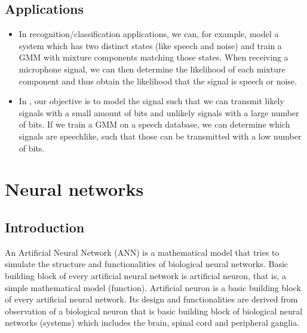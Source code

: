 \documentclass[letterpaper,10pt,english]{jupyterBook}
\begin{document}
\subsection{Applications}
\label{\detokenize{Modelling/Gaussian_mixture_model_GMM:applications}}\begin{itemize}
\item {} 
\sphinxAtStartPar
In recognition/classification applications, we can, for example,
model a system which has two distinct states (like speech and noise)
and train a GMM with mixture components matching those states. When
receiving a microphone signal, we can then determine the likelihood
of each mixture component and thus obtain the likelihood that the
signal is speech or noise.

\item {} 
\sphinxAtStartPar
In , our
objective is to model the signal such that we can transmit likely
signals with a small amount of bits and unlikely signals with a
large number of bits. If we train a GMM on a speech database, we can
determine which signals are speech\sphinxhyphen{}like, such that those can be
transmitted with a low number of bits.

\end{itemize}

\sphinxstepscope


\section{Neural networks}
\label{\detokenize{Modelling/Neural_networks:neural-networks}}\label{\detokenize{Modelling/Neural_networks::doc}}

\subsection{Introduction}
\label{\detokenize{Modelling/Neural_networks:introduction}}
\sphinxAtStartPar
An Artificial Neural Network (ANN) is a mathematical model that tries to simulate the structure and functionalities of biological neural networks. Basic building block of every artificial neural network is artificial neuron, that is, a simple mathematical model
(function).  Artificial neuron is a basic building block of every
artificial neural network. Its design and functionalities are derived from observation of a biological neuron that is basic building block of biological neural networks (systems) which includes the brain, spinal
cord and peripheral ganglia.
\end{document}
